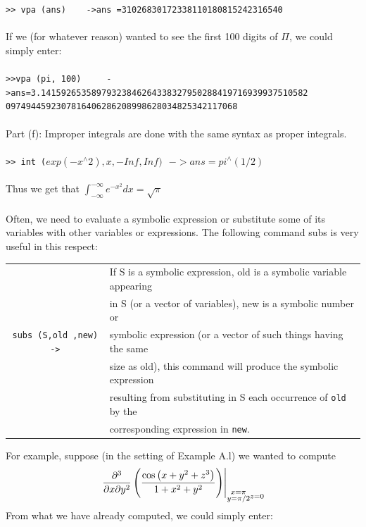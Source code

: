\documentclass[../main.tex]{subfiles}
\begin{document}
\texttt{>> vpa (ans)~~~ ->ans =31026830172338110180815242316540}\\
\\
If we (for whatever reason) wanted to see the first 100 digits of $\Pi$, we could 
simply enter: 
\\
\\
\texttt{>>vpa (pi, 100) ~~~ ->ans=3.14159265358979323846264338327950288419716939937510582 
 }
 \texttt{0974944592307816406286208998628034825342117068}\\
\\
Part (f): Improper integrals are done with the same syntax as proper integrals. 
\\
\\
\texttt{>> int ($exp(-x^{\wedge}2),x,-Inf, Inf)~~~ ->ans = pi^{\wedge}(1/2)$}
\\
\\
Thus we get that $\int_{-\infty}^{-\infty} e^{-x^{2}} d x=\sqrt{\pi}$
\\
\\
Often, we need to evaluate a symbolic expression or substitute some of its 
variables with other variables or expressions. The following command subs is 
very useful in this respect: 
\begin{center}
\begin{tabular}{|c|l|}
\hline
&If S is a symbolic expression, old is a symbolic variable appearing\\
&in S (or a vector of variables), new is a symbolic number or\\
\texttt{subs (S,old ,new) ->}&symbolic expression (or a vector of such things having the same\\
&size as old), this command will produce the symbolic expression\\
&resulting from substituting in S each occurrence of \texttt{old} by the\\
&corresponding expression in \texttt{new}. \\
\hline
\end{tabular}
\end{center}
For example, suppose (in the setting of Example A.l) we wanted to compute
$$
\left.\frac{\partial^{3}}{\partial x \partial y^{2}}\left(\frac{\cos \left(x+y^{2}+z^{3}\right)}{1+x^{2}+y^{2}}\right)\right|_{\substack{x=\pi \\ y=\pi / 2}\\z=0}
$$
From what we have already computed, we could simply enter:
\\
\\
\end{document}
